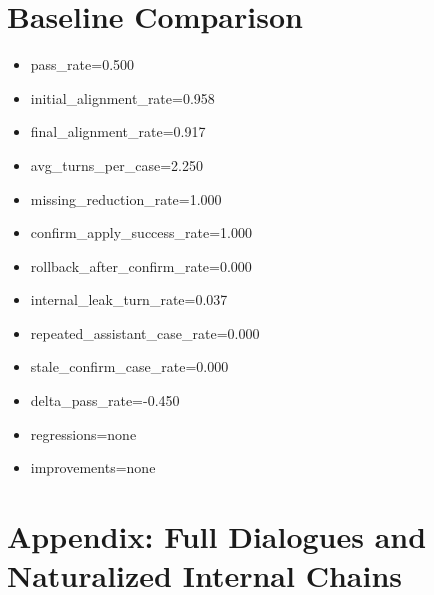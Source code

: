 \documentclass[11pt]{ctexart}
\begin{document}
\section{Baseline Comparison}
\begin{itemize}
\item pass\_rate=0.500
\item initial\_alignment\_rate=0.958
\item final\_alignment\_rate=0.917
\item avg\_turns\_per\_case=2.250
\item missing\_reduction\_rate=1.000
\item confirm\_apply\_success\_rate=1.000
\item rollback\_after\_confirm\_rate=0.000
\item internal\_leak\_turn\_rate=0.037
\item repeated\_assistant\_case\_rate=0.000
\item stale\_confirm\_case\_rate=0.000
\item delta\_pass\_rate=-0.450
\item regressions=none
\item improvements=none
\end{itemize}
\appendix
\section{Appendix: Full Dialogues and Naturalized Internal Chains}
\end{document}

